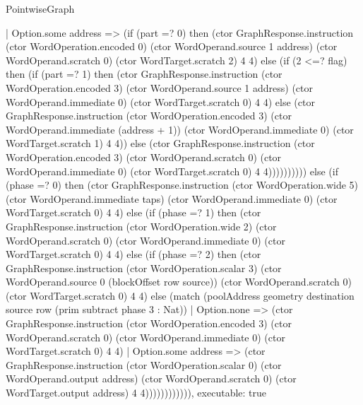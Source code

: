 \begin{lexlean}{PointwiseGraph}
\begin{semanticmodule}
{        | Option.some address => (if (part =? 0) then (ctor GraphResponse.instruction (ctor WordOperation.encoded 0) (ctor WordOperand.source 1 address) (ctor WordOperand.scratch 0) (ctor WordTarget.scratch 2) 4 4) else (if (2 <=? flag) then (if (part =? 1) then (ctor GraphResponse.instruction (ctor WordOperation.encoded 3) (ctor WordOperand.source 1 address) (ctor WordOperand.immediate 0) (ctor WordTarget.scratch 0) 4 4) else (ctor GraphResponse.instruction (ctor WordOperation.encoded 3) (ctor WordOperand.immediate (address + 1)) (ctor WordOperand.immediate 0) (ctor WordTarget.scratch 1) 4 4)) else (ctor GraphResponse.instruction (ctor WordOperation.encoded 3) (ctor WordOperand.scratch 0) (ctor WordOperand.immediate 0) (ctor WordTarget.scratch 0) 4 4)))))))))) else (if (phase =? 0) then (ctor GraphResponse.instruction (ctor WordOperation.wide 5) (ctor WordOperand.immediate taps) (ctor WordOperand.immediate 0) (ctor WordTarget.scratch 0) 4 4) else (if (phase =? 1) then (ctor GraphResponse.instruction (ctor WordOperation.wide 2) (ctor WordOperand.scratch 0) (ctor WordOperand.immediate 0) (ctor WordTarget.scratch 0) 4 4) else (if (phase =? 2) then (ctor GraphResponse.instruction (ctor WordOperation.scalar 3) (ctor WordOperand.source 0 (blockOffset row source)) (ctor WordOperand.scratch 0) (ctor WordTarget.scratch 0) 4 4) else (match (poolAddress geometry destination source row (prim subtract phase 3 : Nat))
        | Option.none => (ctor GraphResponse.instruction (ctor WordOperation.encoded 3) (ctor WordOperand.scratch 0) (ctor WordOperand.immediate 0) (ctor WordTarget.scratch 0) 4 4)
        | Option.some address => (ctor GraphResponse.instruction (ctor WordOperation.scalar 0) (ctor WordOperand.output address) (ctor WordOperand.scratch 0) (ctor WordTarget.output address) 4 4)))))))))))),
  executable: true
}


\end{semanticmodule}
\end{lexlean}
